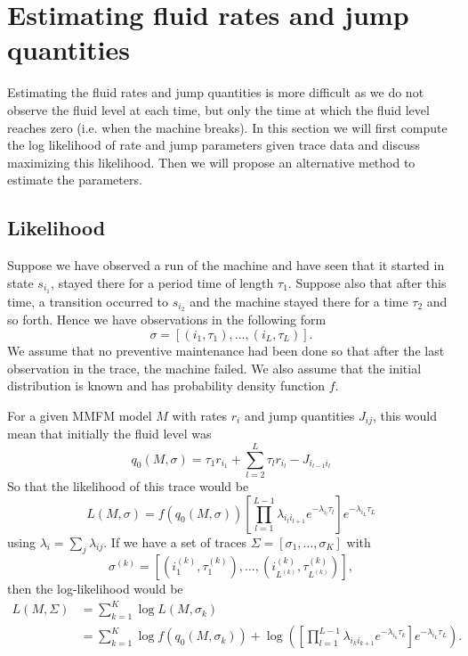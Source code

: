 \documentclass[a4paper]{thesis}
\theoremstyle{definition}
\begin{document}
\section{Estimating fluid rates and jump quantities}
Estimating the fluid rates and jump quantities is more difficult as we do not observe the fluid level at each time, but only the time at which the fluid level reaches zero (i.e. when the machine breaks).
In this section we will first compute the log likelihood of rate and jump parameters given trace data and discuss maximizing this likelihood.
Then we will propose an alternative method to estimate the parameters.

\subsection{Likelihood}
Suppose we have observed a run of the machine and have seen that it started in state $s_{i_1}$, stayed there for a period time of length $\tau_1$.
Suppose also that after this time, a transition occurred to $s_{i_2}$ and the machine stayed there for a time $\tau_2$ and so forth.
Hence we have observations in the following form
$$
\sigma=\left[(i_1,\tau_1),...,(i_L,\tau_L)\right].
$$
We assume that no preventive maintenance had been done so that after the last observation in the trace, the machine failed.
We also assume that the initial distribution is known and has probability density function $f$.

For a given MMFM model $M$ with rates $r_i$ and jump quantities $J_{ij}$, this would mean that initially the fluid level was
\begin{equation}\label{eq:initialLevelDefinition}
q_0(M,\sigma)=\tau_1r_{i_1}+\sum\limits_{l=2}^{L}\tau_lr_{i_l}-J_{i_{l-1}i_l}
\end{equation}
So that the likelihood of this trace would be
$$
L(M,\sigma)=f(q_0(M,\sigma))\left[\prod\limits_{l=1}^{L-1}\lambda_{i_li_{l+1}}e^{-\lambda_{i_l}\tau_l}\right]e^{-\lambda_{i_L}\tau_L}
$$
using $\lambda_i=\sum_j\lambda_{ij}$.
If we have a set of traces $\Sigma=[\sigma_1,...,\sigma_K]$ with \[
\sigma^{(k)}=\left[(i_1^{(k)},\tau_1^{(k)}),...,(i_{L^{(k)}}^{(k)},\tau_{L^{(k)}}^{(k)})\right],
\]
then the log-likelihood would be
\begin{equation}\label{eq:MmfmLikelihood}
\begin{split}
L(M,\Sigma)&=\sum\limits_{k=1}^K\log L(M,\sigma_k)\\
&=\sum\limits_{k=1}^K\log f(q_0(M,\sigma_k))+\log\left(\left[\prod\limits_{l=1}^{L-1}\lambda_{i_ki_{k+1}}e^{-\lambda_{i_k}\tau_k}\right]e^{-\lambda_{i_L}\tau_L}\right).
\end{split}
\end{equation}
\end{document}
